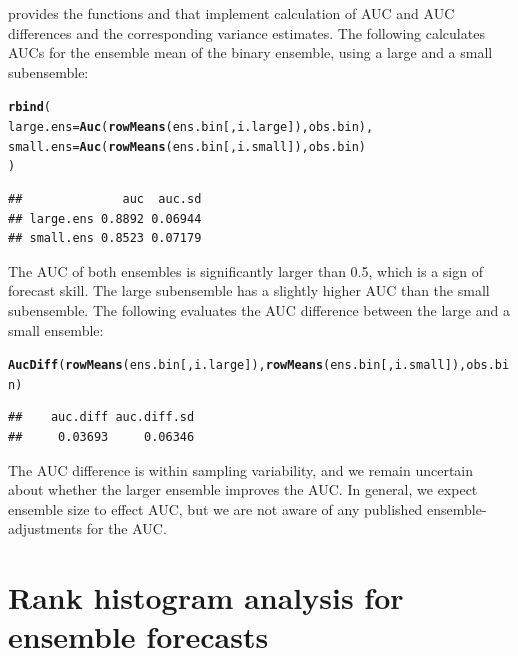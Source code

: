 \documentclass[article]{jss}\usepackage{graphicx, color}
\makeatletter
\newcommand{\hlfunctioncall}[1]{\textcolor[rgb]{0,0.501960784313725,0.752941176470588}{\textbf{#1}}}%
\newenvironment{kframe}{%
 \def\at@end@of@kframe{}%
 \ifinner\ifhmode%
  \def\at@end@of@kframe{\end{minipage}}%
  \begin{minipage}{\columnwidth}%
 \fi\fi%
 \def\FrameCommand##1{\hskip\@totalleftmargin \hskip-\fboxsep
 \colorbox{shadecolor}{##1}\hskip-\fboxsep
     \hskip-\linewidth \hskip-\@totalleftmargin \hskip\columnwidth}%
 \MakeFramed {\advance\hsize-\width
   \@totalleftmargin\z@ \linewidth\hsize
   \@setminipage}}%
 {\par\unskip\endMakeFramed%
 \at@end@of@kframe}
\newenvironment{knitrout}{}{} %
\makeatother
\begin{document}
 provides the functions  and  that implement calculation of AUC and AUC differences and the corresponding variance estimates.
The following calculates AUCs for the ensemble mean of the binary ensemble, using a large and a small subensemble:
%
\begin{knitrout}
\color{fgcolor}\begin{kframe}
\begin{alltt}
\hlfunctioncall{rbind}(
  large.ens = \hlfunctioncall{Auc}(\hlfunctioncall{rowMeans}(ens.bin[, i.large]), obs.bin),
  small.ens = \hlfunctioncall{Auc}(\hlfunctioncall{rowMeans}(ens.bin[, i.small]), obs.bin)
)
\end{alltt}
\begin{verbatim}
##              auc  auc.sd
## large.ens 0.8892 0.06944
## small.ens 0.8523 0.07179
\end{verbatim}
\end{kframe}
\end{knitrout}

%
The AUC of both ensembles is significantly larger than 0.5, which is a sign of forecast skill.
The large subensemble has a slightly higher AUC than the small subensemble.
The following evaluates the AUC difference between the large and a small ensemble:
%
\begin{knitrout}
\color{fgcolor}\begin{kframe}
\begin{alltt}
\hlfunctioncall{AucDiff}(\hlfunctioncall{rowMeans}(ens.bin[, i.large]), \hlfunctioncall{rowMeans}(ens.bin[, i.small]), obs.bin)
\end{alltt}
\begin{verbatim}
##    auc.diff auc.diff.sd 
##     0.03693     0.06346
\end{verbatim}
\end{kframe}
\end{knitrout}

%
The AUC difference is within sampling variability, and we remain uncertain about whether the larger ensemble improves the AUC.
In general, we expect ensemble size to effect AUC, but we are not aware of any published ensemble-adjustments for the AUC. 



\section{Rank histogram analysis for ensemble forecasts}
\end{document}
